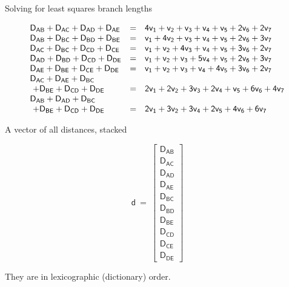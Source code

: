\documentclass[bluish,slideColor,colorBG,pdf]{prosper}
\begin{document}
\begin{slide}[Replace]{Solving for least squares branch lengths}

\[
\begin{array}{l c l}
\mathsf{D_{AB} + D_{AC} + D_{AD} + D_{AE}} & \mathsf{=} & \mathsf{4 v_1 + v_2 + v_3 + v_4 + v_5 + 2 v_6 + 2 v_7}\\
\mathsf{D_{AB}+D_{BC}+D_{BD}+D_{BE}}& \mathsf{=} & \mathsf{v_1 + 4 v_2 + v_3 + v_4 + v_5 + 2 v_6 + 3 v_7}\\
\mathsf{D_{AC} + D_{BC} + D_{CD} + D_{CE}} & \mathsf{=} & \mathsf{v_1 + v_2 + 4 v_3 + v_4 + v_5 + 3 v_6 + 2 v_7}\\
\mathsf{D_{AD} + D_{BD} + D_{CD} + D_{DE}} & \mathsf{=} & \mathsf{v_1 + v_2 + v_3 + 5 v_4 + v_5 + 2 v_6 + 3 v_7}\\
\mathsf{D_{AE} + D_{BE} + D_{CE} + D_{DE}} & \mathsf{=} & \mathsf{v_1 + v_2 + v_3 + v_4 + 4 v_5 + 3 v_6 + 2 v_7}\\
\mathsf{D_{AC}+D_{AE} + D_{BC}} & & \\
\mathsf{\ + D_{BE} + D_{CD} + D_{DE}} & \mathsf{=} & \mathsf{2 v_1 + 2 v_2 + 3 v_3 + 2 v_4 + v_5 + 6 v_6 + 4 v_7}\\
\mathsf{D_{AB}+D_{AD}+D_{BC}}\\
\mathsf{\ + D_{BE} + D_{CD} + D_{DE}} & \mathsf{=} & \mathsf{2 v_1 + 3 v_2 + 3 v_4 + 2 v_5 + 4 v_6 + 6 v_7}
\end{array}
\]

\end{slide}

\begin{slide}[Replace]{A vector of all distances, stacked}

\[
\mathsf{d\  =\  \left[
\begin{array}{c}
\mathsf{D_{AB}}\\
\mathsf{D_{AC}}\\
\mathsf{D_{AD}}\\
\mathsf{D_{AE}}\\
\mathsf{D_{BC}}\\
\mathsf{D_{BD}}\\
\mathsf{D_{BE}}\\
\mathsf{D_{CD}}\\
\mathsf{D_{CE}}\\
\mathsf{D_{DE}}
\end{array}
\right]
}\]
\bigskip

They are in lexicographic (dictionary) order.

\end{slide}
\end{document}
